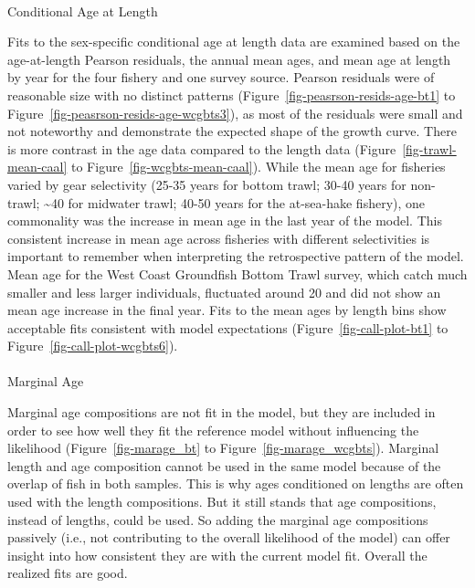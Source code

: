 \documentclass[
]{scrartcl}
\makeatletter
\let\oldparagraph\paragraph
\renewcommand{\paragraph}{
    \@ifstar
      \xxxParagraphStar
      \xxxParagraphNoStar
  }
\newcommand{\xxxParagraphStar}[1]{\oldparagraph*{#1}\mbox{}}
\newcommand{\xxxParagraphNoStar}[1]{\oldparagraph{#1}\mbox{}}
\makeatother
\begin{document}
\paragraph{Conditional Age at Length}\label{conditional-age-at-length}

Fits to the sex-specific conditional age at length data are examined
based on the age-at-length Pearson residuals, the annual mean ages, and
mean age at length by year for the four fishery and one survey source.
Pearson residuals were of reasonable size with no distinct patterns
(Figure~\ref{fig-peasrson-resids-age-bt1} to
Figure~\ref{fig-peasrson-resids-age-wcgbts3}), as most of the residuals
were small and not noteworthy and demonstrate the expected shape of the
growth curve. There is more contrast in the age data compared to the
length data (Figure~\ref{fig-trawl-mean-caal} to
Figure~\ref{fig-wcgbts-mean-caal}). While the mean age for fisheries
varied by gear selectivity (25-35 years for bottom trawl; 30-40 years
for non-trawl; \textasciitilde40 for midwater trawl; 40-50 years for the
at-sea-hake fishery), one commonality was the increase in mean age in
the last year of the model. This consistent increase in mean age across
fisheries with different selectivities is important to remember when
interpreting the retrospective pattern of the model. Mean age for the
West Coast Groundfish Bottom Trawl survey, which catch much smaller and
less larger individuals, fluctuated around 20 and did not show an mean
age increase in the final year. Fits to the mean ages by length bins
show acceptable fits consistent with model expectations
(Figure~\ref{fig-call-plot-bt1} to Figure~\ref{fig-call-plot-wcgbts6}).

\paragraph{Marginal Age}\label{marginal-age}

Marginal age compositions are not fit in the model, but they are
included in order to see how well they fit the reference model without
influencing the likelihood (Figure~\ref{fig-marage_bt} to
Figure~\ref{fig-marage_wcgbts}). Marginal length and age composition
cannot be used in the same model because of the overlap of fish in both
samples. This is why ages conditioned on lengths are often used with the
length compositions. But it still stands that age compositions, instead
of lengths, could be used. So adding the marginal age compositions
passively (i.e., not contributing to the overall likelihood of the
model) can offer insight into how consistent they are with the current
model fit. Overall the realized fits are good.
\end{document}
